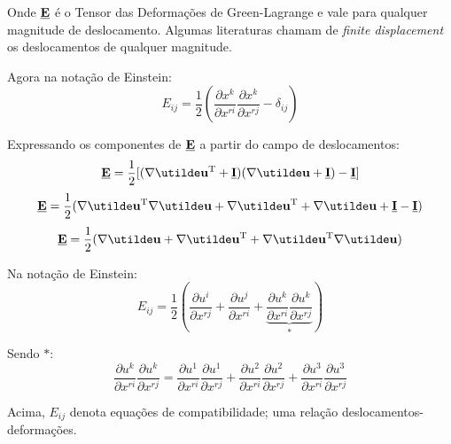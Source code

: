 Onde $\underline{\mathbf{E}}$ é o Tensor das Deformações de Green-Lagrange e vale para qualquer magnitude de deslocamento. Algumas literaturas chamam de \textit{finite displacement} os deslocamentos de qualquer magnitude.

Agora na notação de Einstein:
\[E_{ij}=\frac{1}{2}\left(\frac{\partial x^k}{\partial x^{ri}}\frac{\partial x^k}{\partial x^{rj}}-\delta_{ij}\right)\]
	
Expressando os componentes de $\underline{\mathbf{E}}$ a partir do campo de deslocamentos:
\[\ts{E}=\frac{1}{2}[(\nabla\vt{u}^{\text{T}}+\ts{I})(\nabla\vt{u}+\ts{I})-\ts{I}]\]
\[\ts{E}=\frac{1}{2}(\nabla\vt{u}^{\text{T}}\nabla\vt{u}+\nabla\vt{u}^{\text{T}}+\nabla\vt{u}+\ts{I}-\ts{I})\]
\[\ts{E}=\frac{1}{2}(\nabla\vt{u}+\nabla\vt{u}^{\text{T}}+\nabla\vt{u}^{\text{T}}\nabla\vt{u})\]
	
Na notação de Einstein:
\[E_{ij}=\frac{1}{2}\left(\frac{\partial u^i}{\partial x^{rj}}+\frac{\partial u^j}{\partial x^{ri}}+\underbrace{\frac{\partial u^k}{\partial x^{ri}}\frac{\partial u^k}{\partial x^{rj}}}_{*}\right)\]
	
Sendo $*$:
\[\frac{\partial u^k}{\partial x^{ri}}\frac{\partial u^k}{\partial x^{rj}}=\frac{\partial u^1}{\partial x^{ri}}\frac{\partial u^1}{\partial x^{rj}}+\frac{\partial u^2}{\partial x^{ri}}\frac{\partial u^2}{\partial x^{rj}}+\frac{\partial u^3}{\partial x^{ri}}\frac{\partial u^3}{\partial x^{rj}}\]
	
Acima, $E_{ij}$ denota equações de compatibilidade; uma relação deslocamentos-deformações.
